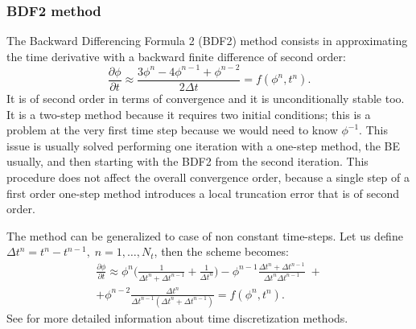 \subsubsection{BDF2 method}
The Backward Differencing Formula 2 (BDF2) method consists in approximating the 
time derivative with a backward finite difference of second order:
\begin{equation} \label{eq:bdf2}
\frac{\partial \phi}{\partial t} \approx 
\frac{3\phi^n-4\phi^{n-1}+\phi^{n-2}}{2\Delta t} = f(\phi^n, t^n).
\end{equation}
It is of second order in terms of convergence and it is 
unconditionally stable too. It is a two-step method because it requires two 
initial conditions; this is a problem at the very first time step because we 
would need to know $\phi^{-1}$. This issue is usually solved performing one 
iteration with a one-step method, the BE usually, and then starting with the 
BDF2 from the second iteration. This procedure does not affect the overall 
convergence order, because a single step of a first order one-step method 
introduces a local truncation error that is of second order.

The method can be generalized to case of non constant time-steps. Let us define 
$\Delta t^n=t^n-t^{n-1}, \; n=1,\dots,N_t$, then the scheme becomes:
\begin{multline} \label{eq:bdf2gen}
\frac{\partial \phi}{\partial t} \approx \phi^n\bigg( \frac{1}{\Delta t^n + 
	\Delta t^{n-1}} + \frac{1}{\Delta t^n}\bigg) - \phi^{n-1} \frac{\Delta t^n 
	+ \Delta t^{n-1}}{\Delta t^n \Delta t^{n-1}} \;+ \\+ \phi^{n-2} 
\frac{\Delta 
	t^n}{\Delta t^{n-1} (\Delta t^n + \Delta t^{n-1})} = f(\phi^n,t^n).
\end{multline}
See \cite{main:matenum} for more detailed information about time discretization 
methods.
%

